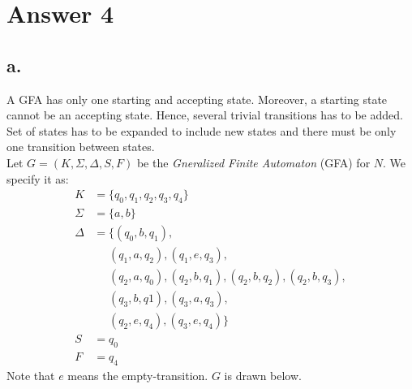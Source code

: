 \documentclass[12pt]{article}
\begin{document}
\section*{Answer 4}
\subsection*{a.}
A GFA has only one starting and accepting state. Moreover, a starting state cannot be an accepting state. Hence, several trivial transitions has to be added. Set of states has to be expanded to include new states and there must be only one transition between states.\\
Let $G=(K, \Sigma, \Delta, S, F)$ be the \textit{Gneralized Finite Automaton} (GFA) for $N$.
We specify it as:
\begin{align*}
    K &= \{q_0, q_1, q_2, q_3, q_4\}\\
    \Sigma &= \{a,b\}\\
    \Delta &= \{(q_0, b, q_1), \\
        &~~~~~~(q_1, a, q_2), (q_1, e, q_3), \\
        &~~~~~~(q_2, a, q_0), (q_2, b, q_1), (q_2, b, q_2), (q_2, b, q_3), \\
        &~~~~~~(q_3, b, q1), (q_3, a, q_3),\\
        &~~~~~~(q_2, e, q_4), (q_3, e, q_4)
        \}\\
    S &= q_0 \\
    F &= q_4
\end{align*}
Note that $e$ means the empty-transition. $G$ is drawn below.
\end{document}
